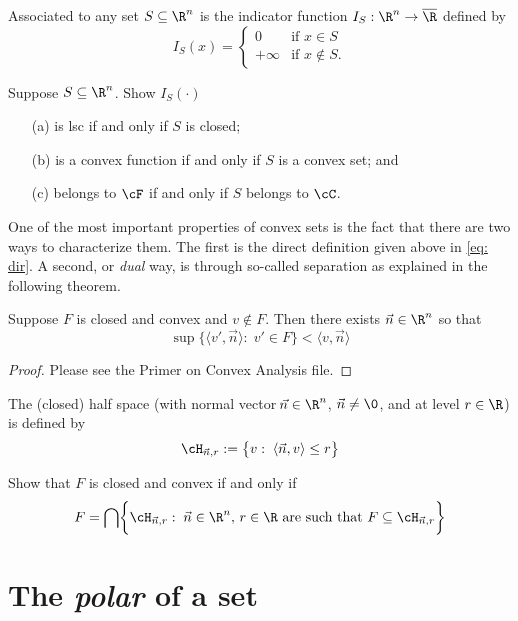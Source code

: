 \documentclass[12pt]{article}
\begin{document}
Associated to any set $S\subseteq \R^n$ is the indicator function $I_S:\R^n\to\overline{\R}$ defined by
\[
I_S(x)=\begin{cases}
0\quad &\text{if }x\in S \\
+\infty &\text{if }x\not\in S.
\end{cases}
\]

{\blue
\begin{exer}  Suppose $S\subseteq \R^n$.  Show $I_S(\cdot)$
\begin{itemize}
\item[(a)] is lsc if and only if $S$ is closed;
\item[(b)] is a convex function if and only if $S$ is a convex set; and
\item[(c)] belongs to $\cF$ if and only if $S$ belongs to $\cC$.
\end{itemize}
\end{exer}
}

One of the most important properties of convex sets is the fact that there are two ways to characterize them.  The first is the direct definition given above in \eqref{eq: dir}.  A second, or {\em dual} way, is through so-called separation as explained in the following theorem.

\begin{thm}\label{thm: sep}
Suppose $F$ is closed and convex and $v\not\in F$.  Then there exists $\vec n\in\R^n$ so that 
\begin{equation}\label{eq: sep}
\sup\bigl\{\langle v',\vec n\rangle:\; v'\in F\bigr\} < \langle v,\vec n\rangle
\end{equation}
\end{thm} 
\begin{proof}  Please see the Primer on Convex Analysis file.
\end{proof}

The (closed) half space (with normal vector $\vec{\! n}\in\R^n$, $\vec n\not=\0$, and at level $r\in\R$) is defined by 
\[
\cH_{\vec{n},r}:=\bigl\{v :\;\langle\vec{n},v\rangle\leq r\bigr\}
\]

{\blue
\begin{exer}
Show that $F$ is closed and convex if and only if
\[
F=\bigcap\biggl\{\cH_{\vec{n},r}:\;\vec{n}\in\R^n,\,r\in\R\text{  are such that } F\subseteq \cH_{\vec{n},r} \biggr\}
\]
\end{exer}}

\section{The {\em polar} of a set} 
\end{document}
